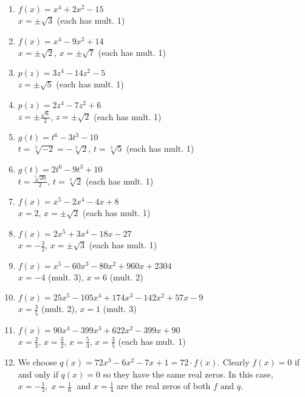\begin{enumerate}
\item $f(x) = x^4+2x^2 - 15$ \\ $x = \pm \sqrt{3}$ (each has mult. 1)
\item $f(x) = x^4-9x^2+14$ \\ $x = \pm \sqrt{2}$, $x = \pm \sqrt{7}$ (each has mult. 1)

\item $p(z) = 3z^4-14z^2-5$ \\ $z = \pm \sqrt{5}$ (each has mult. 1)
\item $p(z)  = 2z^4-7z^2+6$ \\  $z = \pm \frac{\sqrt{6}}{2}$, $z = \pm \sqrt{2}$ (each has mult. 1)

\item $g(t) = t^6-3t^3-10$ \\ $t = \sqrt[3]{-2} = -\sqrt[3]{2}$, $t = \sqrt[3]{5}$ (each has mult. 1)
\item $g(t) = 2t^6-9t^3+10$ \\ $t =\frac{\sqrt[3]{20}}{2} $, $t = \sqrt[3]{2}$ (each has mult. 1)


\item $f(x) = x^5-2x^4-4x+8$ \\ $x = 2$, $x = \pm \sqrt{2}$ (each has mult. 1)
\item $f(x) = 2x^5+3x^4-18x-27$ \\ $x = -\frac{3}{2}$, $x = \pm \sqrt{3}$ (each has mult. 1)

\item $f(x) = x^{5} - 60x^{3} - 80x^{2} + 960x + 2304 $ \\ $x = -4$ (mult. 3), $x = 6$ (mult. 2)


\item $f(x) = 25x^{5} - 105x^{4} + 174x^{3} - 142x^{2} + 57x - 9$ \\ $x = \frac{3}{5}$ (mult. 2), $x = 1$ (mult. 3)

\item $f(x) = 90x^{4} - 399x^{3} + 622x^{2} - 399x + 90$ \\ $x = \frac{2}{3}$, $x = \frac{3}{2}$, $x = \frac{5}{3}$, $x = \frac{3}{5}$ (each has mult. 1)


\item We choose $q(x) = 72x^{3} - 6x^{2} - 7x + 1 = 72 \cdot f(x)$.  Clearly $f(x) = 0$ if and only if $q(x) = 0$ so they have the same real zeros.  In this case, $x = -\frac{1}{3}, \; x = \frac{1}{6} \;$ and $x = \frac{1}{4}$ are the real zeros of both $f$ and $q$.


\setcounter{HW}{\value{enumi}}
\end{enumerate}


